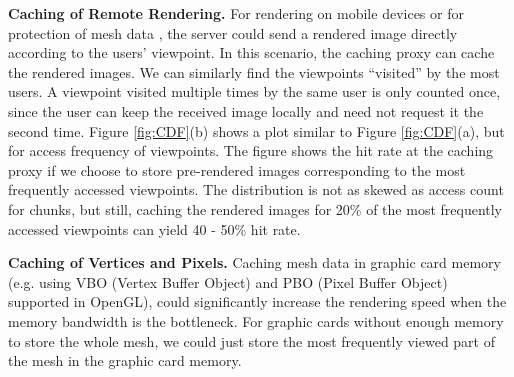 \textbf{Caching of Remote Rendering.}
For rendering on mobile devices \cite{bao06remote} or for 
protection of mesh data \cite{koller04scanview}, 
the server could send a rendered image directly according to the users' viewpoint.
In this
scenario, the caching proxy can cache the rendered images.  We can
similarly find the viewpoints ``visited'' by the most users.  A
viewpoint visited multiple times by the same user is only counted
once, since the user can keep the received image locally and need not
request it the second time.  Figure \ref{fig:CDF}(b) shows a plot
similar to Figure \ref{fig:CDF}(a), but for access frequency of 
viewpoints.  The figure shows the hit rate at the caching proxy 
if we choose to store pre-rendered images corresponding to the
most frequently accessed viewpoints.
The distribution is not as skewed as access count for chunks, 
but still, caching the rendered images for 20\% of the most 
frequently accessed viewpoints can yield 40 - 50\% hit rate.

\textbf{Caching of Vertices and Pixels.}
Caching mesh data in graphic card memory 
(e.g. using VBO (Vertex Buffer Object) and PBO (Pixel Buffer Object) supported in OpenGL), 
could significantly increase the rendering speed when the memory bandwidth is the bottleneck.
For graphic cards without enough memory to store the whole mesh, we could just store the most frequently viewed part of the mesh
in the graphic card memory. 

